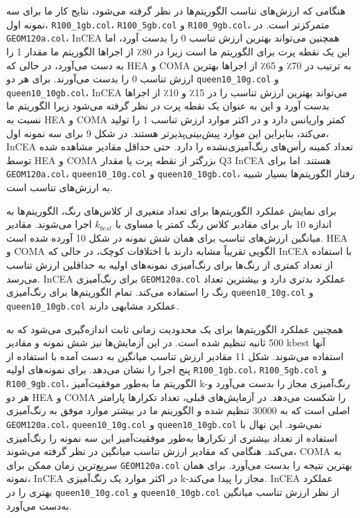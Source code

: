 \documentclass[a4paper,10pt]{article}
\begin{document}
            هنگامی که ارزش‌های تناسب الگوریتم‌ها در نظر گرفته می‌شود، نتایج کار ما برای سه نمونه اول، \texttt{R100\_1gb.col}، \texttt{R100\_5gb.col} و \texttt{R100\_9gb.col}، متمرکزتر است. در \texttt{GEOM120a.col}، InCEA همچنین می‌تواند بهترین ارزش تناسب 0 را بدست آورد، اما این یک نقطه پرت برای الگوریتم ما است زیرا در 80٪ از اجراها الگوریتم ما مقدار 1 را به دست می‌آورد، در حالی که HEA و COMA به ترتیب در 70٪ و 65٪ از اجراها بهترین ارزش تناسب 0 را بدست می‌آورند. برای هر دو \texttt{queen10\_10g.col} و \texttt{queen10\_10gb.col}، InCEA می‌تواند بهترین ارزش تناسب را در 15٪ و 10٪ از اجراها بدست آورد و این به عنوان یک نقطه پرت در نظر گرفته می‌شود زیرا الگوریتم ما نسبت به HEA و COMA کمتر واریانس دارد و در اکثر موارد ارزش تناسب 1 را تولید می‌کند، بنابراین این موارد پیش‌بینی‌پذیرتر هستند. در شکل 9 برای سه نمونه اول، InCEA تعداد کمینه رأس‌های رنگ‌آمیزی‌نشده را دارد. حتی حداقل مقادیر مشاهده شده توسط HEA و COMA بزرگتر از نقطه پرت یا مقدار Q3 InCEA هستند. اما برای \texttt{GEOM120a.col}، \texttt{queen10\_10g.col} و \texttt{queen10\_10gb.col}، رفتار الگوریتم‌ها بسیار شبیه به ارزش‌های تناسب است.

            برای نمایش عملکرد الگوریتم‌ها برای تعداد متغیری از کلاس‌های رنگ، الگوریتم‌ها به اندازه 10 بار برای مقادیر کلاس رنگ کمتر یا مساوی با $k_{best}$ اجرا می‌شوند. مقادیر میانگین ارزش‌های تناسب برای همان شش نمونه در شکل 10 آورده شده است. HEA و COMA الگویی تقریباً مشابه دارند با اختلافات کوچک، در حالی که InCEA با استفاده از تعداد کمتری از رنگ‌ها برای رنگ‌آمیزی نمونه‌های اولیه به حداقلین ارزش تناسب می‌رسد. InCEA برای رنگ‌آمیزی \texttt{GEOM120a.col} عملکرد بدتری دارد و بیشترین تعداد رنگ را استفاده می‌کند. تمام الگوریتم‌ها برای رنگ‌آمیزی \texttt{queen10\_10g.col} و \texttt{queen10\_10gb.col} عملکرد مشابهی دارند.

            همچنین عملکرد الگوریتم‌ها برای یک محدودیت زمانی ثابت اندازه‌گیری می‌شود که به 500 ثانیه تنظیم شده است. در این آزمایش‌ها نیز شش نمونه و مقادیر kbest آنها استفاده می‌شوند. شکل 11 مقادیر ارزش تناسب میانگین به دست آمده با استفاده از پنج اجرا را نشان می‌دهد. برای نمونه‌های اولیه \texttt{R100\_1gb.col}، \texttt{R100\_5gb.col} و \texttt{R100\_9gb.col}، الگوریتم ما به‌طور موفقیت‌آمیز k-رنگ‌آمیزی مجاز را بدست می‌آورد و هر دو HEA و COMA را شکست می‌دهد. در آزمایش‌های قبلی، تعداد تکرارها پارامتر اصلی است که به 30000 تنظیم شده و الگوریتم ما در بیشتر موارد موفق به رنگ‌آمیزی \texttt{GEOM120a.col}، \texttt{queen10\_10g.col} و \texttt{queen10\_10gb.col} نمی‌شود. این نهال با استفاده از تعداد بیشتری از تکرارها به‌طور موفقیت‌آمیز این سه نمونه را رنگ‌آمیزی می‌کند. هنگامی که مقادیر ارزش تناسب میانگین در نظر گرفته می‌شوند، COMA به سریع‌ترین زمان ممکن برای \texttt{GEOM120a.col} بهترین نتیجه را بدست می‌آورد. برای همان نمونه، InCEA در اکثر موارد یک رنگ‌آمیزی k-مجاز را پیدا می‌کند. InCEA عملکرد بهتری را در \texttt{queen10\_10g.col} و \texttt{queen10\_10gb.col} از نظر ارزش تناسب میانگین به‌دست می‌آورد.
\end{document}
